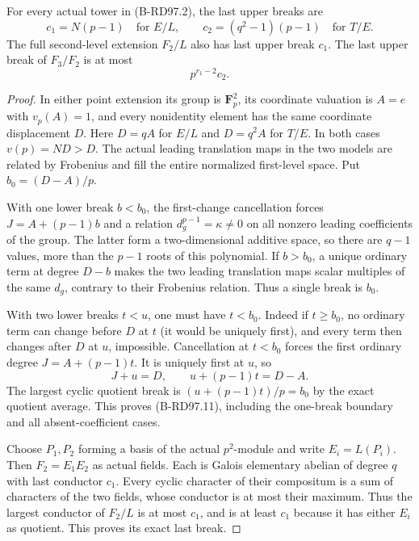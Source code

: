 \begin{lemma}
\label{lem:B-RD97-conductors}
For every actual tower in (B-RD97.2), the last upper breaks are
\[
 c_1=N(p-1)\quad\text{for }E/L,\qquad
 c_2=(q^2-1)(p-1)\quad\text{for }T/E.
                                                        \tag{B-RD97.11}
\]
The full second-level extension $F_2/L$ also has last upper
break $c_1$. The last upper break of $F_3/F_2$ is at most
\[
                         p^{r_1-2}c_2.               \tag{B-RD97.12}
\]
\end{lemma}
\begin{proof}
In either point extension its group is $\mathbf F_p^2$, its
coordinate valuation is $A=e$ with $v_p(A)=1$, and every
nonidentity element has the same coordinate displacement $D$.
Here $D=qA$ for $E/L$ and $D=q^2A$ for $T/E$. In both cases
$v(p)=ND>D$. The actual leading translation maps in the two
models are related by Frobenius and fill the entire normalized
first-level space. Put $b_0=(D-A)/p$.

With one lower break $b<b_0$, the first-change cancellation
forces $J=A+(p-1)b$ and a relation $d_g^{p-1}=\kappa\ne0$
on all nonzero leading coefficients of the group. The latter
form a two-dimensional additive space, so there are $q-1$
values, more than the $p-1$ roots of this polynomial.
If $b>b_0$, a unique ordinary term at degree $D-b$ makes the
two leading translation maps scalar multiples of the same $d_g$,
contrary to their Frobenius relation. Thus a single break is $b_0$.

With two lower breaks $t<u$, one must have $t<b_0$. Indeed if
$t\ge b_0$, no ordinary term can change before $D$ at $t$
(it would be uniquely first), and every term then changes after
$D$ at $u$, impossible. Cancellation at $t<b_0$ forces the
first ordinary degree $J=A+(p-1)t$. It is uniquely first at $u$,
so
\[
                  J+u=D,\qquad u+(p-1)t=D-A.
                                                        \tag{B-RD97.13}
\]
The largest cyclic quotient break is $(u+(p-1)t)/p=b_0$ by
the exact quotient average. This proves (B-RD97.11), including
the one-break boundary and all absent-coefficient cases.

Choose $P_1,P_2$ forming a basis of the actual $p^2$-module and
write $E_i=L(P_i)$. Then $F_2=E_1E_2$ as actual fields.
Each is Galois elementary abelian of degree $q$ with last
conductor $c_1$. Every cyclic character of their compositum is
a sum of characters of the two fields, whose conductor is at
most their maximum. Thus the largest conductor of $F_2/L$ is
at most $c_1$, and is at least $c_1$ because it has either
$E_i$ as quotient. This proves its exact last break.


\end{proof}
